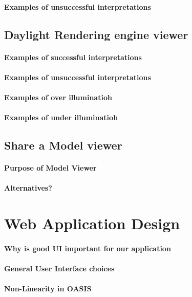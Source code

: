 			\paragraph{Examples of unsuccessful interpretations}

		\subsection{Daylight Rendering engine viewer}
			\paragraph{Examples of successful interpretations}
			\paragraph{Examples of unsuccessful interpretations}
				\paragraph{Examples of over illuminatioh}
				\paragraph{Examples of under illuminatioh}

		\subsection{Share a Model viewer}
			\paragraph{Purpose of Model Viewer}
			\paragraph{Alternatives?}

	\section{Web Application Design}
		\paragraph{Why is good UI important for our application}
		\paragraph{General User Interface choices}
		\paragraph{Non-Linearity in OASIS}
